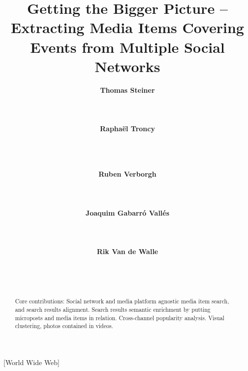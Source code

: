 \documentclass{acm_proc_article-sp}
\begin{document}
\title{Getting the Bigger Picture -- Extracting Media Items Covering Events from Multiple Social Networks}

\author{
\alignauthor
\textbf{Thomas Steiner}\\
	\\
	\\
	\\
\alignauthor
\textbf{Raphaël Troncy}\\
	\\
	\\
	\\
\and
\alignauthor
\textbf{Ruben Verborgh}\\ 	
	\\
	\\
	\\
\alignauthor
\textbf{Joaquim Gabarró Vallés}\\
	\\
	\\
	\\
\alignauthor
\textbf{Rik Van de Walle}\\
	\\
	\\
	\\
}

\maketitle

\begin{abstract}
Core contributions:
Social network and media platform agnostic media item search, and search results alignment.
Search results semantic enrichment by putting microposts and media items in relation.
Cross-channel popularity analysis.
Visual clustering, photos contained in videos.
\end{abstract}

[World Wide Web]
\end{document}
